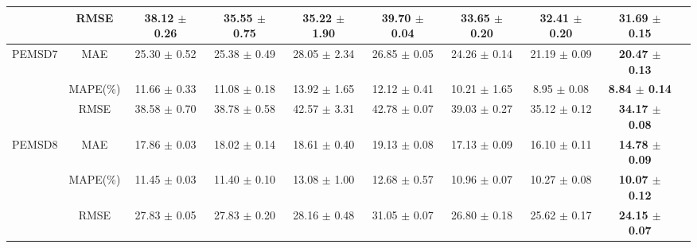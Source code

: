 \begin{table}[!htb]
{\begin{tabular}{cccccccccc}
            \multicolumn{1}{c|}{}                        & \multicolumn{1}{c|}{RMSE}     & 38.12 $\pm$ 0.26 & 35.55 $\pm$ 0.75 & 35.22 $\pm$ 1.90 & 39.70 $\pm$ 0.04 & 33.65 $\pm$ 0.20 & 32.41 $\pm$ 0.20 & \textbf{31.69 $\pm$ 0.15} \\
            \hline
            \multicolumn{1}{c|}{\multirow{3}{*}{PEMSD7}} & \multicolumn{1}{c|}{MAE}      & 25.30 $\pm$ 0.52 & 25.38 $\pm$ 0.49 & 28.05 $\pm$ 2.34 & 26.85 $\pm$ 0.05 & 24.26 $\pm$ 0.14 & 21.19 $\pm$ 0.09      & \textbf{20.47 $\pm$ 0.13} \\
            \multicolumn{1}{c|}{}                        & \multicolumn{1}{c|}{MAPE(\%)} & 11.66 $\pm$ 0.33 & 11.08 $\pm$ 0.18 & 13.92 $\pm$ 1.65 & 12.12 $\pm$ 0.41 & 10.21 $\pm$ 1.65 & 8.95 $\pm$ 0.08       & \textbf{8.84 $\pm$ 0.14}  \\
            \multicolumn{1}{c|}{}                        & \multicolumn{1}{c|}{RMSE}     & 38.58 $\pm$ 0.70 & 38.78 $\pm$ 0.58 & 42.57 $\pm$ 3.31 & 42.78 $\pm$ 0.07 & 39.03 $\pm$ 0.27 & 35.12 $\pm$ 0.12      & \textbf{34.17 $\pm$ 0.08} \\
            \hline
            \multicolumn{1}{c|}{\multirow{3}{*}{PEMSD8}} & \multicolumn{1}{c|}{MAE}      & 17.86 $\pm$ 0.03 & 18.02 $\pm$ 0.14 & 18.61 $\pm$ 0.40 & 19.13 $\pm$ 0.08 & 17.13 $\pm$ 0.09 & 16.10 $\pm$ 0.11 & \textbf{14.78 $\pm$ 0.09} \\
            \multicolumn{1}{c|}{}                        & \multicolumn{1}{c|}{MAPE(\%)} & 11.45 $\pm$ 0.03 & 11.40 $\pm$ 0.10 & 13.08 $\pm$ 1.00 & 12.68 $\pm$ 0.57 & 10.96 $\pm$ 0.07 & 10.27 $\pm$ 0.08 & \textbf{10.07 $\pm$ 0.12} \\
            \multicolumn{1}{c|}{}                        & \multicolumn{1}{c|}{RMSE}     & 27.83 $\pm$ 0.05 & 27.83 $\pm$ 0.20 & 28.16 $\pm$ 0.48 & 31.05 $\pm$ 0.07 & 26.80 $\pm$ 0.18 & 25.62 $\pm$ 0.17 & \textbf{24.15 $\pm$ 0.07} \\
           \bottomrule[2pt]
        \end{tabular}
    }
\end{table}

